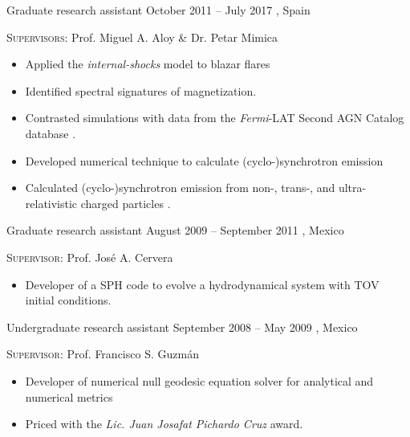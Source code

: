 \cventry{}%
{\DAAval}%
{Graduate research assistant}%
{October 2011 -- July 2017}%
{\UVval, Spain}%
{\textsc{Supervisors}: Prof. Miguel A. Aloy \& Dr. Petar Mimica
  \begin{itemize}
    \item Applied the \emph{internal-shocks} model to blazar flares
    \item Identified spectral signatures of magnetization. 
    \item Contrasted simulations with data from the \emph{Fermi}-LAT Second AGN Catalog database \cite{RuedaBecerril:2014mi}.
    \item Developed numerical technique to calculate (cyclo-)synchrotron emission
    \item Calculated (cyclo-)synchrotron emission from non-, trans-, and ultra-relativistic charged particles \cite{RuedaBecerril:2017mi}.
  \end{itemize}
}
\cventry{}%
{\IFMes}%
{Graduate research assistant}%
{\hspace{-30ex}August 2009 -- September 2011}%
{\UMSNHes, Mexico}%
{\textsc{Supervisor}: Prof. José A. Cervera
  \begin{itemize}
    \item Developer of a SPH code to evolve a hydrodynamical system with TOV initial conditions.
  \end{itemize}
}
\cventry{}%
{\FCes}%
{Undergraduate research assistant}%
{September 2008 -- May 2009}%
{\UAEMes, Mexico}%
{\textsc{Supervisor}: Prof. Francisco S. Guzmán
  \begin{itemize}
    \item Developer of numerical null geodesic equation solver for analytical and numerical metrics \cite{Guzman:2009ru}
    \item Priced with the \emph{Lic. Juan Josafat Pichardo Cruz} award.
  \end{itemize}
}
